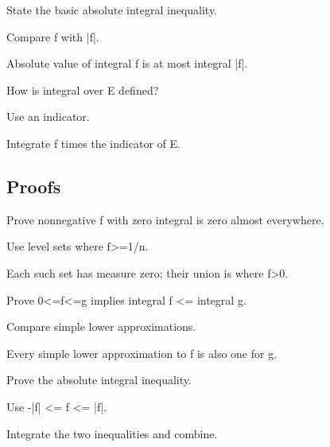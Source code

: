 \begin{exercise}\label{exr:iii03-expand-04}
State the basic absolute integral inequality.
\end{exercise}
\begin{hint}
Compare f with |f|.
\end{hint}
\begin{solution}
Absolute value of integral f is at most integral |f|.
\end{solution}

\begin{exercise}\label{exr:iii03-expand-05}
How is integral over E defined?
\end{exercise}
\begin{hint}
Use an indicator.
\end{hint}
\begin{solution}
Integrate f times the indicator of E.
\end{solution}

\subsection*{Proofs}

\begin{exercise}\label{exr:iii03-expand-06}
Prove nonnegative f with zero integral is zero almost everywhere.
\end{exercise}
\begin{hint}
Use level sets where f>=1/n.
\end{hint}
\begin{solution}
Each such set has measure zero; their union is where f>0.
\end{solution}

\begin{exercise}[Monotonicity]\label{exr:iii03-expand-07}
Prove 0<=f<=g implies integral f <= integral g.
\end{exercise}
\begin{hint}
Compare simple lower approximations.
\end{hint}
\begin{solution}
Every simple lower approximation to f is also one for g.
\end{solution}

\begin{exercise}\label{exr:iii03-expand-08}
Prove the absolute integral inequality.
\end{exercise}
\begin{hint}
Use -|f| <= f <= |f|.
\end{hint}
\begin{solution}
Integrate the two inequalities and combine.
\end{solution}

